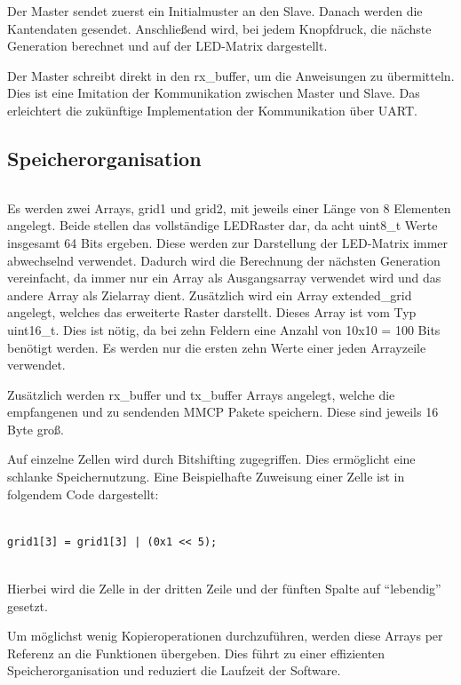 Der Master sendet zuerst ein Initialmuster an den Slave. Danach werden die
Kantendaten gesendet. Anschließend wird, bei jedem Knopfdruck, die nächste
Generation berechnet und auf der LED-Matrix dargestellt.

Der Master schreibt direkt in den rx\_buffer, um die Anweisungen zu
übermitteln. Dies ist eine Imitation der Kommunikation zwischen Master und
Slave. Das erleichtert die zukünftige Implementation der Kommunikation über
UART.

\subsection{Speicherorganisation}

\inputminted[linenos,fontsize=\footnotesize, firstline=4, lastline=11]{c}{A10_Abgabe/iceduino_setup_gol/sw/programs/iceduino_game_of_life/main.c}

Es werden zwei Arrays, grid1 und grid2, mit jeweils einer Länge von 8 Elementen
angelegt. Beide stellen das vollständige LED\-Raster dar, da acht uint8\_t
Werte insgesamt 64 Bits ergeben. Diese werden zur Darstellung der LED-Matrix
immer abwechselnd verwendet. Dadurch wird die Berechnung der nächsten
Generation vereinfacht, da immer nur ein Array als Ausgangsarray verwendet wird
und das andere Array als Zielarray dient. Zusätzlich wird ein Array
extended\_grid angelegt, welches das erweiterte Raster darstellt. Dieses Array
ist vom Typ uint16\_t. Dies ist nötig, da bei zehn Feldern eine Anzahl von
10x10 = 100 Bits benötigt werden. Es werden nur die ersten zehn Werte einer
jeden Arrayzeile verwendet.

Zusätzlich werden rx\_buffer und tx\_buffer Arrays angelegt, welche die
empfangenen und zu sendenden MMCP Pakete speichern. Diese sind jeweils 16 Byte
groß.

Auf einzelne Zellen wird durch Bitshifting zugegriffen. Dies ermöglicht eine
schlanke Speichernutzung. Eine Beispielhafte Zuweisung einer Zelle ist in
folgendem Code dargestellt:
\begin{verbatim}

grid1[3] = grid1[3] | (0x1 << 5);
    
\end{verbatim}

Hierbei wird die Zelle in der dritten Zeile und der fünften Spalte auf
"`lebendig"' gesetzt.

Um möglichst wenig Kopieroperationen durchzuführen, werden diese Arrays per
Referenz an die Funktionen übergeben. Dies führt zu einer effizienten
Speicherorganisation und reduziert die Laufzeit der Software.

